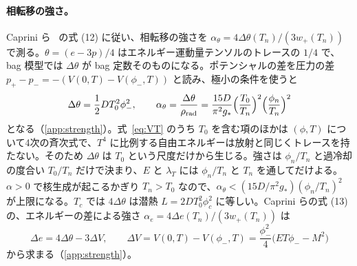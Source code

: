 \documentclass[a4paper,10pt]{ltjsarticle}
\begin{document}
\paragraph{相転移の強さ。}Caprini ら~\cite{caprini20} の式 (12) に従い、相転移の強さを $\alpha_\theta=4\Delta\theta(T_n)/(3w_+(T_n))$ で測る。$\theta=(e-3p)/4$ はエネルギー運動量テンソルのトレースの $1/4$ で、bag 模型では $\Delta\theta$ が bag 定数そのものになる。ポテンシャルの差を圧力の差 $p_+-p_-=-(V(0,T)-V(\phi_-,T))$ と読み、極小の条件を使うと
\begin{equation}
\Delta\theta=\frac12DT_0^2\phi_-^2,\qquad
\alpha_\theta=\frac{\Delta\theta}{\rho_{\mathrm{rad}}}=\frac{15D}{\pi^2g_*}\Bigl(\frac{T_0}{T_n}\Bigr)^2\Bigl(\frac{\phi_n}{T_n}\Bigr)^2
\label{eq:alphatheta}
\end{equation}
となる（\ref{app:strength}）。式~\eqref{eq:VT} のうち $T_0$ を含む項のほかは $(\phi,T)$ について4次の斉次式で、$T^4$ に比例する自由エネルギーは放射と同じくトレースを持たない。そのため $\Delta\theta$ は $T_0$ という尺度だけから生じる。強さは $\phi_n/T_n$ と過冷却の度合い $T_0/T_n$ だけで決まり、$E$ と $\lambda_T$ には $\phi_n/T_n$ と $T_n$ を通してだけよる。$\alpha>0$ で核生成が起こるかぎり $T_n>T_0$ なので、$\alpha_\theta<(15D/\pi^2g_*)(\phi_n/T_n)^2$ が上限になる。$T_c$ では $4\Delta\theta$ は潜熱 $L=2DT_0^2\phi_c^2$ に等しい。Caprini らの式 (13) の、エネルギーの差による強さ $\alpha_e=4\Delta e(T_n)/(3w_+(T_n))$ は
\begin{equation}
\Delta e=4\Delta\theta-3\Delta V,\qquad \Delta V=V(0,T)-V(\phi_-,T)=\frac{\phi_-^2}{4}\bigl(ET\phi_--M^2\bigr)
\label{eq:alphae}
\end{equation}
から求まる（\ref{app:strength}）。
\end{document}
